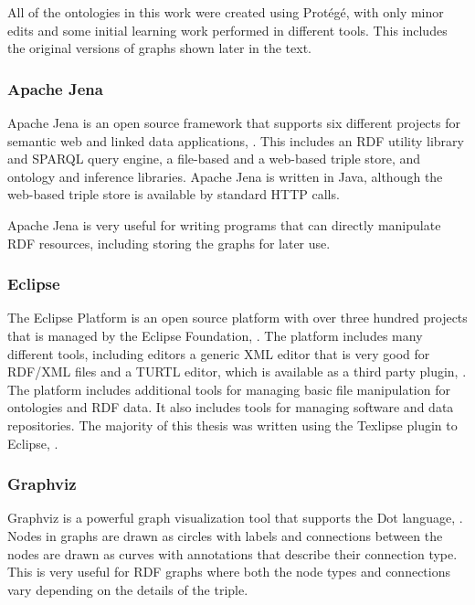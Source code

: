All of the ontologies in this work were created using Prot\'eg\'e, with only
minor edits and some initial learning work performed in different tools. This
includes the original versions of graphs shown later in the text.

\subsubsection{Apache Jena}

Apache Jena is an open source framework that supports six different projects for
semantic web and linked data applications, \cite{apache-jena}. This includes an
RDF utility library and SPARQL query engine, a file-based and a web-based
triple store, and ontology and inference libraries. Apache Jena is written in
Java, although the web-based triple store is available by standard HTTP calls.

Apache Jena is very useful for writing programs that can directly manipulate RDF
resources, including storing the graphs for later use.

\subsubsection{Eclipse}

The Eclipse Platform is an open source platform with over three hundred projects
that is managed by the Eclipse Foundation, \cite{eclipse}. The platform includes
many different tools, including editors a generic XML editor that is very good
for RDF/XML files and a TURTL editor, which is available as a third party
plugin, \cite{xturtl}. The platform includes additional tools for managing basic
file manipulation for ontologies and RDF data. It also includes tools for
managing software and data repositories. The majority of this thesis was
written using the Texlipse plugin to Eclipse, \cite{texlipse}.

\subsubsection{Graphviz}

Graphviz is a powerful graph visualization tool that supports the Dot language,
\cite{graphviz}. Nodes in graphs are drawn as circles with labels and
connections between the nodes are drawn as curves with annotations that describe
their connection type. This is very useful for RDF graphs where both the node
types and connections vary depending on the details of the triple.


